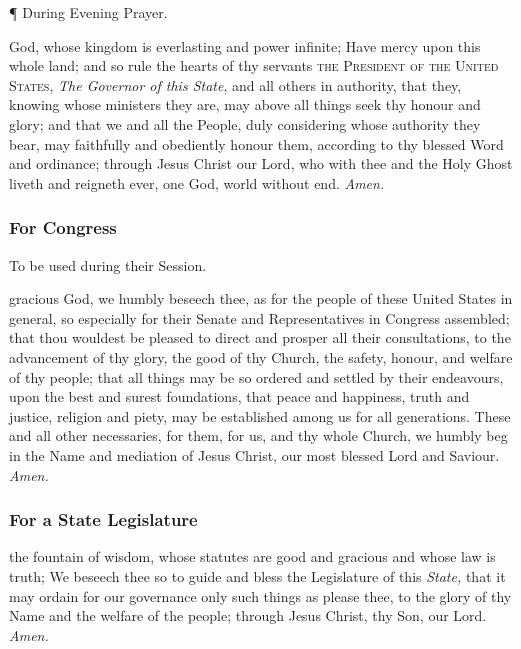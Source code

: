 \vspace{0.25\baselineskip}

\begin{inhead}
	\P{ }During Evening Prayer.
\end{inhead}

\vspace{0.25\baselineskip}


 God, whose kingdom is everlasting and power infinite; Have mercy upon this whole land; and so rule the hearts of thy servants \textsc{the President of the United States}, \textit{The Governor of this State}, and all others in authority, that they, knowing whose ministers they are, may above all things seek thy honour and glory; and that we and all the People, duly considering whose authority they bear, may faithfully and obediently honour them, according to thy blessed Word and ordinance; through Jesus Christ our Lord, who with thee and the Holy Ghost liveth and reigneth ever, one God, world without end. \textit{Amen.}

\subsubsection{For Congress}

\begin{rubric}
To be used during their Session.
\end{rubric}
 gracious God, we humbly beseech thee, as for the people of these United States in general, so especially for their Senate and Representatives in Congress assembled; that thou wouldest be pleased to direct and prosper all their consultations, to the advancement of thy glory, the good of thy Church, the safety, honour, and welfare of thy people; that all things may be so ordered and settled by their endeavours, upon the best and surest foundations, that peace and happiness, truth and justice, religion and piety, may be established among us for all generations. These and all other necessaries, for them, for us, and thy whole Church, we humbly beg in the Name and mediation of Jesus Christ, our most blessed Lord and Saviour. \textit{Amen.}

\subsubsection{For a State Legislature}

 the fountain of wisdom, whose statutes are good and gracious and whose law is truth; We beseech thee so to guide and bless the Legislature of this \textit{State,} that it may ordain for our governance only such things as please thee, to the glory of thy Name and the welfare of the people; through Jesus Christ, thy Son, our Lord. \textit{Amen.}

